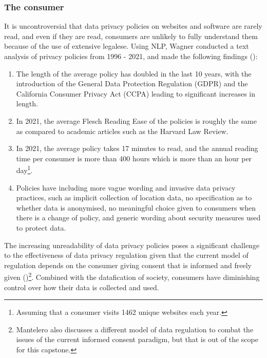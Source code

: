 \subsubsection{The consumer}
It is uncontroversial that data privacy policies on websites and software are rarely read, and even if they are read, consumers are unlikely to fully understand them because of the use of extensive legalese. Using NLP, Wagner conducted a text analysis of privacy policies from 1996 - 2021, and made the following findings (\cite{wagner2022privacy}): 

\begin{enumerate}
  \item The length of the average policy has doubled in the last 10 years, with the introduction of the General Data Protection Regulation (GDPR) and the California Consumer Privacy Act (CCPA) leading to significant increases in length.
  \item In 2021, the average Flesch Reading Ease of the policies is roughly the same as compared to academic articles such as the Harvard Law Review.
  \item In 2021, the average policy takes 17 minutes to read, and the annual reading time per consumer is more than 400 hours which is more than an hour per day\footnote{Assuming that a consumer visits 1462 unique websites each year.}.
  \item Policies have including more vague wording and invasive data privacy practices, such as implicit collection of location data, no specification as to whether data is anonymised, no meaningful choice given to consumers when there is a change of policy, and generic wording about security measures used to protect data.
\end{enumerate}

The increasing unreadability of data privacy policies poses a significant challenge to the effectiveness of data privacy regulation given that the current model of regulation depends on the consumer giving consent that is informed and freely given (\cite{mantelero_2014})\footnote{Mantelero also discusses a different model of data regulation to combat the issues of the current informed consent paradigm, but that is out of the scope for this capstone.}. Combined with the datafication of society, consumers have diminishing control over how their data is collected and used. 

